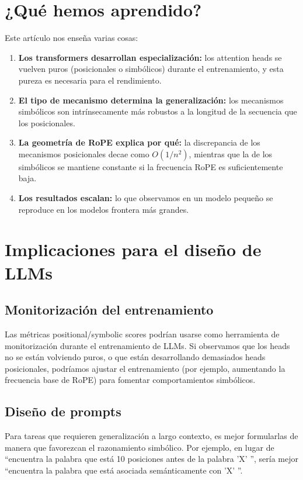 \documentclass[12pt,a4paper,oneside]{report}
\begin{document}
\section{¿Qué hemos aprendido?}

Este artículo nos enseña varias cosas:

\begin{enumerate}
    \item \textbf{Los transformers desarrollan especialización:} los attention heads se vuelven puros (posicionales o simbólicos) durante el entrenamiento, y esta pureza es necesaria para el rendimiento.
    \item \textbf{El tipo de mecanismo determina la generalización:} los mecanismos simbólicos son intrínsecamente más robustos a la longitud de la secuencia que los posicionales.
    \item \textbf{La geometría de RoPE explica por qué:} la discrepancia de los mecanismos posicionales decae como $O(1/n^2)$, mientras que la de los simbólicos se mantiene constante si la frecuencia RoPE es suficientemente baja.
    \item \textbf{Los resultados escalan:} lo que observamos en un modelo pequeño se reproduce en los modelos frontera más grandes.
\end{enumerate}

\section{Implicaciones para el diseño de LLMs}

\subsection{Monitorización del entrenamiento}

Las métricas positional/symbolic scores podrían usarse como herramienta de monitorización durante el entrenamiento de LLMs. Si observamos que los heads no se están volviendo puros, o que están desarrollando demasiados heads posicionales, podríamos ajustar el entrenamiento (por ejemplo, aumentando la frecuencia base de RoPE) para fomentar comportamientos simbólicos.

\subsection{Diseño de prompts}

Para tareas que requieren generalización a largo contexto, es mejor formularlas de manera que favorezcan el razonamiento simbólico. Por ejemplo, en lugar de ``encuentra la palabra que está 10 posiciones antes de la palabra 'X' '', sería mejor ``encuentra la palabra que está asociada semánticamente con 'X' ''.
\end{document}
